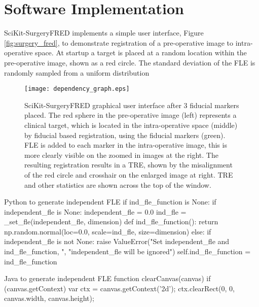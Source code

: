 \section{Software Implementation}
SciKit-SurgeryFRED implements a simple user interface, Figure \ref{fig:surgery_fred}, to demonstrate registration of a pre-operative image to intra-operative space. At startup a target is placed at a random location within the pre-operative image, shown as a red circle. The standard deviation of the \gls{FLE} is randomly sampled from a uniform distribution 

\begin{figure}
	\begin{center}
	\texttt{[image: dependency\_graph.eps]}
		\caption{\label{fig:dependencies}SciKit-SurgeryFRED graphical user interface after 3 fiducial markers placed. The red sphere in the pre-operative image (left) represents a clinical target, which is located in the
		intra-operative space (middle) by fiducial based registration, using the fiducial markers (green). FLE is added to each marker in the intra-operative image, this is more clearly visible on the zoomed in images at the right. The resulting registration results in a TRE, shown by the misalignment of the red circle and crosshair 
		on the enlarged image at right. TRE and other statistics are shown across the top
		of the window.}
	\end{center}
\end{figure}
\begin{pythonlisting}{Python to generate independent FLE}
if ind_fle_function is None:
    if independent_fle is None:
        independent_fle = 0.0
        ind_fle = _set_fle(independent_fle, dimension)
        def ind_fle_function():
        return np.random.normal(loc=0.0, scale=ind_fle, size=dimension)
    else:
        if independent_fle is not None:
            raise ValueError("Set independent_fle and ind_fle_function, ",
                             "independent_fle will be ignored")
    self.ind_fle_function = ind_fle_function
\end{pythonlisting}
	
\begin{javalisting}{Java to generate independent FLE}
function clearCanvas(canvas) {
  if (canvas.getContext) {
    var ctx = canvas.getContext('2d');
    ctx.clearRect(0, 0, canvas.width, canvas.height);
  }
}
\end{javalisting}

